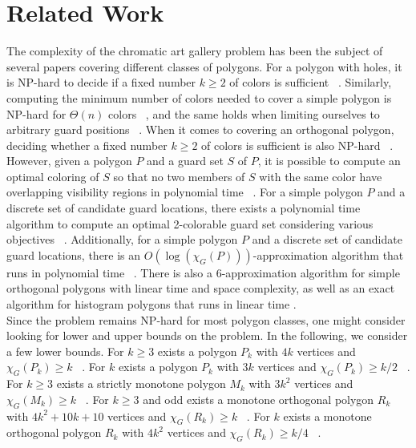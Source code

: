 \section{Related Work}
The complexity of the chromatic art gallery problem has been the subject of several papers covering different classes of polygons.
For a polygon with holes, it is NP-hard to decide if a fixed number $k \geq 2$ of colors is sufficient ~\cite{fekete2014complexity}. Similarly, computing the minimum number of colors needed to cover a simple polygon is NP-hard for $\Theta(n)$ colors ~\cite{fekete2014complexity}, and the same holds when limiting ourselves to arbitrary guard positions ~\cite{fekete2014chromatic}. When it comes to covering an orthogonal polygon, deciding whether a fixed number $k \geq 2$ of colors is sufficient is also NP-hard ~\cite{hoorfar2021np}. However, given a polygon $P$ and a guard set $S$ of $P$, it is possible to compute an optimal coloring of $S$ so that no two members of $S$ with the same color have overlapping visibility regions in polynomial time ~\cite{erickson2011many}. For a simple polygon $P$ and a discrete set of candidate guard locations, there exists a polynomial time algorithm to compute an optimal 2-colorable guard set considering various objectives ~\cite{fekete2014chromatic}. Additionally, for a simple polygon $P$ and a discrete set of candidate guard locations, there is an $O(\log (\chi_G(P)))$-approximation algorithm that runs in polynomial time ~\cite{fekete2014chromatic}. There is also a 6-approximation algorithm for simple orthogonal polygons with linear time and space complexity, as well as an exact algorithm for histogram polygons that runs in linear time \cite{hoorfar2021np}.\\
Since the problem remains NP-hard for most polygon classes, one might consider looking for lower and upper bounds on the problem.
In the following, we consider a few lower bounds.
For $k \geq 3$ exists a polygon $P_k$ with $4k$ vertices and $\chi_G(P_k) \geq k$ ~\cite{erickson2012art}.
For $k$ exists a polygon $P_k$ with $3k$ vertices and $\chi_G(P_k) \geq k/2$ ~\cite{bartschi2011coloring}.
For $k \geq 3$ exists a strictly monotone polygon $M_k$ with $3k^2$ vertices and $\chi_G(M_k) \geq k$ ~\cite{erickson2012art}.
For $k \geq 3$ and odd exists a monotone orthogonal polygon $R_k$ with $4k^2 + 10k + 10$ vertices and $\chi_G(R_k) \geq k$ ~\cite{erickson2012art}.
For $k$ exists a monotone orthogonal polygon $R_k$ with $4k^2$ vertices and $\chi_G(R_k) \geq k/4$ ~\cite{bartschi2011coloring}.\\
